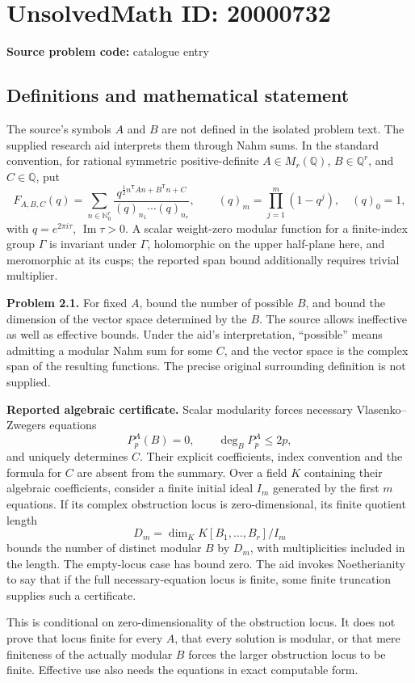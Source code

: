 \documentclass[11pt]{article}
\newcommand{\N}{\mathbb{N}}
\newcommand{\Q}{\mathbb{Q}}
\begin{document}
\section*{UnsolvedMath ID: 20000732}
\textbf{Source problem code:} catalogue entry
\subsection{Definitions and mathematical statement}
The source's symbols $A$ and $B$ are not defined in the isolated problem text. The supplied research aid interprets them through Nahm sums. In the standard convention, for rational symmetric positive-definite $A\in M_r(\Q)$, $B\in\Q^r$, and $C\in\Q$, put
\[
 F_{A,B,C}(q)=\sum_{n\in\N_0^r}
 \frac{q^{\frac12n^{\mathsf T}An+B^{\mathsf T}n+C}}{(q)_{n_1}\cdots(q)_{n_r}},\qquad
 (q)_m=\prod_{j=1}^m(1-q^j),\quad(q)_0=1,
\]
with $q=e^{2\pi i\tau}$, $\operatorname{Im}\tau>0$. A scalar weight-zero modular function for a finite-index group $\Gamma$ is invariant under $\Gamma$, holomorphic on the upper half-plane here, and meromorphic at its cusps; the reported span bound additionally requires trivial multiplier.

\textbf{Problem 2.1.} For fixed $A$, bound the number of possible $B$, and bound the dimension of the vector space determined by the $B$. The source allows ineffective as well as effective bounds. Under the aid's interpretation, ``possible'' means admitting a modular Nahm sum for some $C$, and the vector space is the complex span of the resulting functions. The precise original surrounding definition is not supplied.

\textbf{Reported algebraic certificate.} Scalar modularity forces necessary Vlasenko--Zwegers equations
\[
 P_p^A(B)=0,\qquad\deg_B P_p^A\leq2p,
\]
and uniquely determines $C$. Their explicit coefficients, index convention and the formula for $C$ are absent from the summary. Over a field $K$ containing their algebraic coefficients, consider a finite initial ideal $I_m$ generated by the first $m$ equations. If its complex obstruction locus is zero-dimensional, its finite quotient length
\[
 D_m=\dim_K K[B_1,\ldots,B_r]/I_m
\]
bounds the number of distinct modular $B$ by $D_m$, with multiplicities included in the length. The empty-locus case has bound zero. The aid invokes Noetherianity to say that if the full necessary-equation locus is finite, some finite truncation supplies such a certificate.

This is conditional on zero-dimensionality of the obstruction locus. It does not prove that locus finite for every $A$, that every solution is modular, or that mere finiteness of the actually modular $B$ forces the larger obstruction locus to be finite. Effective use also needs the equations in exact computable form.
\end{document}
